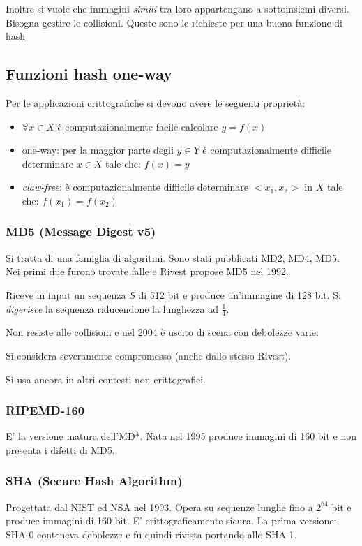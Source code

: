 Inoltre si vuole che immagini \emph{simili} tra loro appartengano a sottoinsiemi diversi.
Bisogna gestire le collisioni.
Queste sono le richieste per una buona funzione di hash

\subsection{Funzioni hash one-way}
Per le applicazioni crittografiche si devono avere le seguenti proprietà:
\begin{itemize}
    \item $\forall x \in X$ è computazionalmente facile calcolare $y = f(x)$
    \item one-way: per la maggior parte degli $y \in Y$ è computazionalmente difficile determinare $x \in X$ tale che: $f(x) = y$
    \item \emph{claw-free}: è computazionalmente difficile determinare $<x_1, x_2>$ in $X$ tale che: $f(x_1)=f(x_2)$ 
\end{itemize}

\subsubsection{MD5 (Message Digest v5)}
Si tratta di una famiglia di algoritmi.
Sono stati pubblicati MD2, MD4, MD5.
Nei primi due furono trovate falle e Rivest propose MD5 nel 1992.

Riceve in input un sequenza $S$ di 512 bit e produce un'immagine di 128 bit.
Si \emph{digerisce} la sequenza riducendone la lunghezza ad $\frac{1}{4}$.

Non resiste alle collisioni e nel 2004 è uscito di scena con debolezze varie.

Si considera severamente compromesso (anche dallo stesso Rivest).

Si usa ancora in altri contesti non crittografici.

\subsubsection{RIPEMD-160}
E' la versione matura dell'MD*. Nata nel 1995 produce immagini di 160 bit e non presenta i difetti di MD5.

\subsubsection{SHA (Secure Hash Algorithm)}
Progettata dal NIST ed NSA nel 1993.
Opera su sequenze lunghe fino a $2^{64}$ bit e produce immagini di 160 bit.
E' crittograficamente sicura.
La prima versione: SHA-0 conteneva debolezze e fu quindi rivista portando allo SHA-1.

